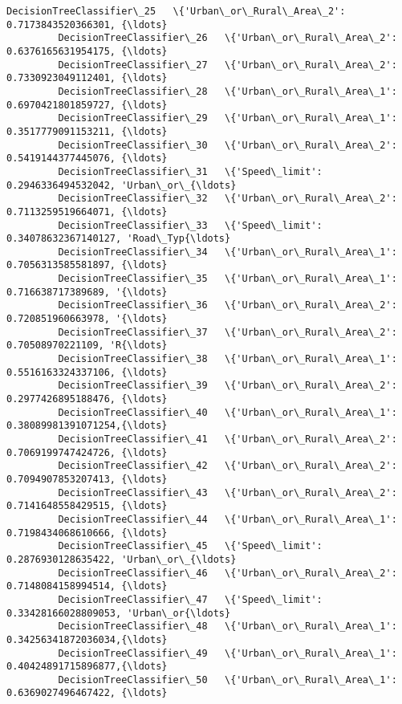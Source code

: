 \documentclass[11pt]{article}
\begin{document}
\begin{Verbatim}[commandchars=\\\{\}]
         DecisionTreeClassifier\_25   \{'Urban\_or\_Rural\_Area\_2': 0.7173843520366301, {\ldots}   
         DecisionTreeClassifier\_26   \{'Urban\_or\_Rural\_Area\_2': 0.6376165631954175, {\ldots}   
         DecisionTreeClassifier\_27   \{'Urban\_or\_Rural\_Area\_2': 0.7330923049112401, {\ldots}   
         DecisionTreeClassifier\_28   \{'Urban\_or\_Rural\_Area\_1': 0.6970421801859727, {\ldots}   
         DecisionTreeClassifier\_29   \{'Urban\_or\_Rural\_Area\_1': 0.3517779091153211, {\ldots}   
         DecisionTreeClassifier\_30   \{'Urban\_or\_Rural\_Area\_2': 0.5419144377445076, {\ldots}   
         DecisionTreeClassifier\_31   \{'Speed\_limit': 0.2946336494532042, 'Urban\_or\_{\ldots}   
         DecisionTreeClassifier\_32   \{'Urban\_or\_Rural\_Area\_2': 0.7113259519664071, {\ldots}   
         DecisionTreeClassifier\_33   \{'Speed\_limit': 0.34078632367140127, 'Road\_Typ{\ldots}   
         DecisionTreeClassifier\_34   \{'Urban\_or\_Rural\_Area\_1': 0.7056313585581897, {\ldots}   
         DecisionTreeClassifier\_35   \{'Urban\_or\_Rural\_Area\_1': 0.716638717389689, '{\ldots}   
         DecisionTreeClassifier\_36   \{'Urban\_or\_Rural\_Area\_2': 0.720851960663978, '{\ldots}   
         DecisionTreeClassifier\_37   \{'Urban\_or\_Rural\_Area\_2': 0.70508970221109, 'R{\ldots}   
         DecisionTreeClassifier\_38   \{'Urban\_or\_Rural\_Area\_1': 0.5516163324337106, {\ldots}   
         DecisionTreeClassifier\_39   \{'Urban\_or\_Rural\_Area\_2': 0.2977426895188476, {\ldots}   
         DecisionTreeClassifier\_40   \{'Urban\_or\_Rural\_Area\_1': 0.38089981391071254,{\ldots}   
         DecisionTreeClassifier\_41   \{'Urban\_or\_Rural\_Area\_2': 0.7069199747424726, {\ldots}   
         DecisionTreeClassifier\_42   \{'Urban\_or\_Rural\_Area\_2': 0.7094907853207413, {\ldots}   
         DecisionTreeClassifier\_43   \{'Urban\_or\_Rural\_Area\_2': 0.7141648558429515, {\ldots}   
         DecisionTreeClassifier\_44   \{'Urban\_or\_Rural\_Area\_1': 0.7198434068610666, {\ldots}   
         DecisionTreeClassifier\_45   \{'Speed\_limit': 0.2876930128635422, 'Urban\_or\_{\ldots}   
         DecisionTreeClassifier\_46   \{'Urban\_or\_Rural\_Area\_2': 0.7148084158994514, {\ldots}   
         DecisionTreeClassifier\_47   \{'Speed\_limit': 0.33428166028809053, 'Urban\_or{\ldots}   
         DecisionTreeClassifier\_48   \{'Urban\_or\_Rural\_Area\_1': 0.34256341872036034,{\ldots}   
         DecisionTreeClassifier\_49   \{'Urban\_or\_Rural\_Area\_1': 0.40424891715896877,{\ldots}   
         DecisionTreeClassifier\_50   \{'Urban\_or\_Rural\_Area\_1': 0.6369027496467422, {\ldots}   

\end{Verbatim}
\end{document}
